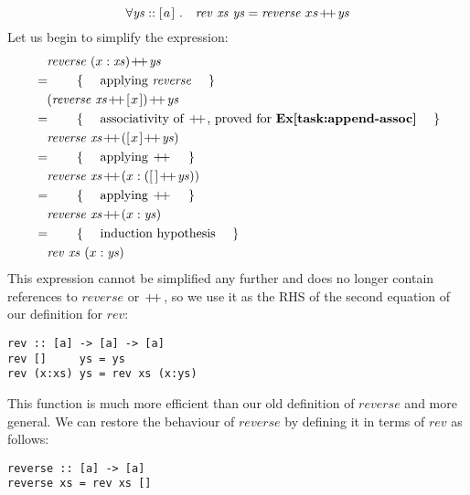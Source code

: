 \begin{displaymath}
\forall \mathit{ys} :: \hslist{a}~. \quad \mathit{rev}~\mathit{xs}~\mathit{ys} = \mathit{reverse}~xs \append \mathit{ys}
\end{displaymath}
Let us begin to simplify the expression:
\begin{align*}
\expr{\mathit{reverse}~(x:\mathit{xs}) \append \mathit{ys}}
\hint{applying $\mathit{reverse}$}
\expr{(\mathit{reverse}~\mathit{xs} \append \hslist{x}) \append \mathit{ys}}
\hint{associativity of $\append$, proved for \textbf{Ex\ref{task:append-assoc}}}
\expr{\mathit{reverse}~\mathit{xs} \append (\hslist{x} \append \mathit{ys})}
\hint{applying $\append$}
\expr{\mathit{reverse}~\mathit{xs} \append (x : (\hslist{} \append \mathit{ys}))}
\hint{applying $\append$}
\expr{\mathit{reverse}~\mathit{xs} \append (x : \mathit{ys})}
\hint{induction hypothesis}
\lastexpr{\mathit{rev}~\mathit{xs}~(x:\mathit{ys})}
\end{align*}
This expression cannot be simplified any further and does no longer contain references to $\mathit{reverse}$ or $\append$, so we use it as the RHS of the second equation of our definition for $\mathit{rev}$:
\begin{verbatim}
rev :: [a] -> [a] -> [a]
rev []     ys = ys
rev (x:xs) ys = rev xs (x:ys)
\end{verbatim} 
This function is much more efficient than our old definition of $\mathit{reverse}$ and more general. We can restore the behaviour of $\mathit{reverse}$ by defining it in terms of $\mathit{rev}$ as follows:
\begin{verbatim}
reverse :: [a] -> [a] 
reverse xs = rev xs []
\end{verbatim} 